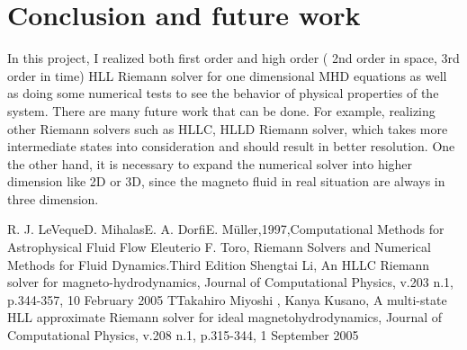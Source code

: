 \documentclass[11pt, oneside]{article}   	%
\begin{document}
\section{Conclusion and future work}
In this project, I realized both first order and high order ( 2nd order in space, 3rd order in time) HLL Riemann solver for one dimensional MHD equations as well as doing some numerical tests to see the behavior of physical properties of the system. There are many future work that can be done. For example, realizing other Riemann solvers such as HLLC, HLLD Riemann solver, which takes more intermediate states into consideration and should result in better resolution. One the other hand, it is necessary to expand the numerical solver into higher dimension like 2D or 3D, since the magneto fluid in real situation are always in three dimension.

\begin{thebibliography}{}
R. J. LeVequeD. MihalasE. A. DorfiE. Müller,1997,Computational Methods for Astrophysical Fluid Flow
 Eleuterio F. Toro, Riemann Solvers and Numerical Methods for Fluid Dynamics.Third Edition
Shengtai Li, An HLLC Riemann solver for magneto-hydrodynamics, Journal of Computational Physics, v.203 n.1, p.344-357, 10 February 2005
 TTakahiro Miyoshi , Kanya Kusano, A multi-state HLL approximate Riemann solver for ideal magnetohydrodynamics, Journal of Computational Physics, v.208 n.1, p.315-344, 1 September 2005 
\end{thebibliography}
\end{document}
